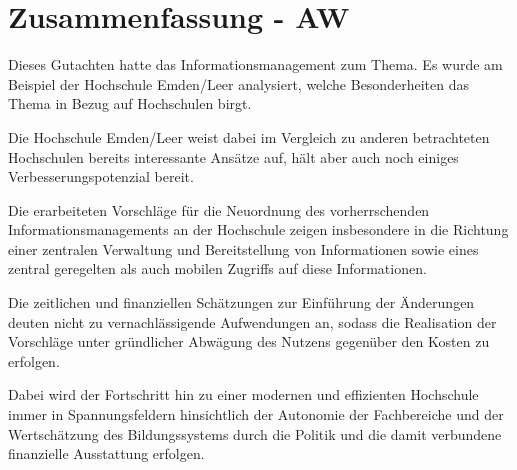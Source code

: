 \chapter{Zusammenfassung - AW}
Dieses Gutachten hatte das Informationsmanagement zum Thema. 
Es wurde am Beispiel der Hochschule Emden/Leer analysiert, welche 
Besonderheiten das Thema in Bezug auf Hochschulen birgt.

Die Hochschule Emden/Leer weist dabei im Vergleich zu anderen 
betrachteten Hochschulen bereits  interessante Ansätze auf, 
hält aber auch noch einiges Verbesserungspotenzial bereit. 

Die erarbeiteten Vorschläge für die Neuordnung des vorherrschenden 
Informationsmanagements an der Hochschule zeigen insbesondere 
in die Richtung einer zentralen Verwaltung und Bereitstellung von 
Informationen sowie eines zentral geregelten als auch mobilen 
Zugriffs auf diese Informationen.

Die zeitlichen und finanziellen Schätzungen zur Einführung der 
Änderungen deuten nicht zu vernachlässigende Aufwendungen an, 
sodass die Realisation der Vorschläge unter gründlicher Abwägung 
des Nutzens gegenüber den Kosten zu erfolgen. 

Dabei wird der Fortschritt hin zu einer modernen und effizienten 
Hochschule immer in  Spannungsfeldern hinsichtlich der Autonomie 
der Fachbereiche und der Wertschätzung des Bildungssystems 
durch die Politik und die damit verbundene finanzielle Ausstattung erfolgen.
